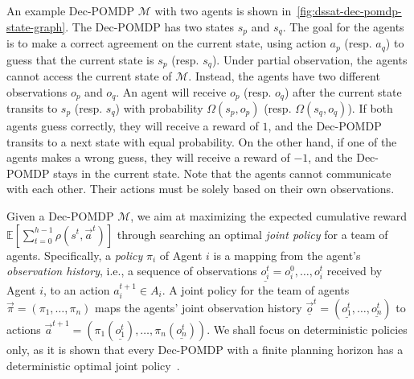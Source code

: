\begin{example}
    An example Dec-POMDP $\mathcal{M}$ with two agents is shown in~\cref{fig:dssat-dec-pomdp-state-graph}.
    The Dec-POMDP has two states $s_p$ and $s_q$.
    The goal for the agents is to make a correct agreement on the current state,
    using action $a_p$ (resp. $a_q$) to guess that the current state is $s_p$ (resp. $s_q$).
    Under partial observation, the agents cannot access the current state of $\mathcal{M}$.
    Instead, the agents have two different observations $o_p$ and $o_q$.
    An agent will receive $o_p$ (resp. $o_q$) after the current state transits to $s_p$ (resp. $s_q$) with probability $\Omega(s_p,o_p)$ (resp. $\Omega(s_q,o_q)$).
    If both agents guess correctly, they will receive a reward of $1$,
    and the Dec-POMDP transits to a next state with equal probability.
    On the other hand, if one of the agents makes a wrong guess, they will receive a reward of $-1$,
    and the Dec-POMDP stays in the current state.
    Note that the agents cannot communicate with each other.
    Their actions must be solely based on their own observations.
\end{example}

Given a Dec-POMDP $\mathcal{M}$,
we aim at maximizing the expected cumulative reward $\mathbb{E}[\sum_{t=0}^{h-1}\rho(s^t,\vec{a}^t)]$ through searching an optimal \textit{joint policy} for a team of agents.
Specifically, a \textit{policy} $\pi_i$ of Agent $i$ is a mapping from the agent's \textit{observation history},
i.e., a sequence of observations $\underline{o_i^t}=o_i^0,\ldots,o_i^t$ received by Agent $i$,
to an action $a_i^{t+1}\in A_i$.
A joint policy for the team of agents $\vec{\pi}=(\pi_1,\ldots,\pi_n)$ maps the agents' joint observation history $\vec{\underline{o}}^t=(\underline{o_1^t},\ldots,\underline{o_n^t})$ to actions $\vec{a}^{t+1}=(\pi_1(\underline{o_1^t}),\ldots,\pi_n(\underline{o_n^t}))$.
We shall focus on deterministic policies only,
as it is shown that every Dec-POMDP with a finite planning horizon has a deterministic optimal joint policy~\cite{Oliehoek2008}.

